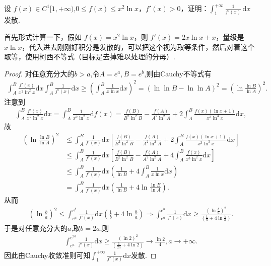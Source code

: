 \documentclass[../../main.tex]{subfiles}
\begin{document}
\begin{example}
设 $f(x)\in C^{1}[1,+\infty)$,$0\leqslant  f(x)\leqslant  x^{2}\ln x$，$f'(x)>0$，证明：$\int_{1}^{+\infty}\frac{1}{f'(x)}\,\mathrm{d}x$ 发散.
\end{example}
\begin{note}
首先形式计算一下，假如 $f(x)=x^{2}\ln x$，则 $f'(x)=2x\ln x+x$，量级是 $x\ln x$，代入进去刚刚好积分是发散的，可以把这个视为取等条件，然后对着这个取等，使用柯西不等式（目标是去掉难以处理的分母）.
\end{note}
\begin{proof}
对任意充分大的$b>a$,令$A=e^a,B=e^b$,则由Cauchy不等式有
\begin{align*}
\int_A^B{\frac{f' \left( x \right)}{x^2\ln ^2x}\mathrm{d}x}\int_A^B{\frac{1}{f' \left( x \right)}\mathrm{d}x}\geqslant \left( \int_A^B{\frac{1}{x\ln x}\mathrm{d}x} \right) ^2=\left( \ln\ln B-\ln\ln A \right) ^2=\left( \ln \frac{\ln B}{\ln A} \right) ^2.
\end{align*}
注意到
\begin{align*}
\int_A^B{\frac{f' \left( x \right)}{x^2\ln ^2x}\mathrm{d}x}=\int_A^B{\frac{1}{x^2\ln ^2x}\mathrm{d}f\left( x \right)}=\frac{f\left( B \right)}{B^2\ln ^2B}-\frac{f\left( A \right)}{A^2\ln ^2A}+2\int_A^B{\frac{f\left( x \right) \left( \ln x+1 \right)}{x^3\ln ^3x}\mathrm{d}x},
\end{align*}
故
\begin{align*}
\left( \ln \frac{\ln B}{\ln A} \right) ^2&\leqslant \int_A^B{\frac{1}{f' \left( x \right)}\mathrm{d}x}\left[ \frac{f\left( B \right)}{B^2\ln ^2B}-\frac{f\left( A \right)}{A^2\ln ^2A}+2\int_A^B{\frac{f\left( x \right) \left( \ln x+1 \right)}{x^3\ln ^3x}\mathrm{d}x} \right] \\
&\leqslant \int_A^B{\frac{1}{f' \left( x \right)}\mathrm{d}x}\left[ \frac{f\left( B \right)}{B^2\ln ^2B}-\frac{f\left( A \right)}{A^2\ln ^2A}+4\int_A^B{\frac{f\left( x \right)}{x^3\ln ^2x}\mathrm{d}x} \right] \\
&\leqslant \int_A^B{\frac{1}{f' \left( x \right)}\mathrm{d}x}\left( \frac{1}{\ln B}+4\int_A^B{\frac{1}{x\ln x}\mathrm{d}x} \right) \\
&=\int_A^B{\frac{1}{f' \left( x \right)}\mathrm{d}x}\left( \frac{1}{\ln B}+4\ln \frac{\ln B}{\ln A} \right) .
\end{align*}
从而
\begin{align*}
\left( \ln \frac{b}{a} \right) ^2\leqslant \int_{e^a}^{e^b}{\frac{1}{f' \left( x \right)}\mathrm{d}x}\left( \frac{1}{b}+4\ln \frac{b}{a} \right)
\Rightarrow \int_{e^a}^{e^b}{\frac{1}{f' \left( x \right)}\mathrm{d}x}\geqslant \frac{\left( \ln \frac{b}{a} \right) ^2}{\left( \frac{1}{b}+4\ln \frac{b}{a} \right)}.
\end{align*}
于是对任意充分大的$a$,取$b=2a$,则
\begin{align*}
\int_{e^a}^{e^{2a}}{\frac{1}{f' \left( x \right)}\mathrm{d}x}\geqslant \frac{\left( \ln 2 \right) ^2}{\left( \frac{1}{2a}+4\ln 2 \right)}\rightarrow \frac{\ln 2}{4},a\rightarrow +\infty .
\end{align*}
因此由Cauchy收敛准则可知$\int_1^{+\infty}{\frac{1}{f' \left( x \right)}\mathrm{d}x}$发散.

\end{proof}
\end{document}
